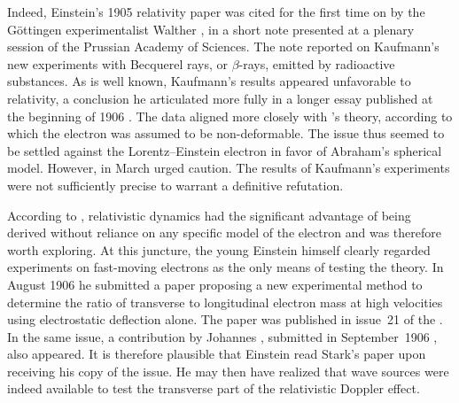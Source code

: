 \documentclass[pdflatex]{sn-jnl} %
\providecommand{\DIFdelbegin}{} %
\providecommand{\DIFdelend}{} %
\begin{document}
Indeed, Einstein’s 1905 relativity paper was cited for the first time on  by the Göttingen experimentalist Walther \citet[954]{Kaufmann1905}, in a short note presented at a plenary session of the Prussian Academy of Sciences. The note reported on Kaufmann’s new experiments with Becquerel rays, or $\beta$-rays, emitted by radioactive substances. As is well known, Kaufmann’s results appeared unfavorable to relativity, a conclusion he articulated more fully in a longer essay published at the beginning of 1906 \citep{Kaufmann1906}. The data aligned more closely with \Abr's theory, according to which the electron was assumed to be non-deformable. The issue thus seemed to be settled against the Lorentz--Einstein electron in favor of Abraham’s spherical model. However, in March \citet{Planck1906a} urged caution. The results of Kaufmann’s experiments were not sufficiently precise to warrant a definitive refutation.

According to \citet{Planck1906}, relativistic dynamics had the significant advantage of being derived without reliance on any specific model of the electron and was therefore worth exploring. At this juncture, the young Einstein himself clearly regarded experiments on fast-moving electrons as the only means of testing the theory. In August 1906 he submitted a paper \citep{Einstein1906c} proposing a new experimental method to determine the ratio of transverse to longitudinal electron mass at high velocities using electrostatic deflection alone. The paper was published in issue~21 of the . In the same issue, a contribution by Johannes \citet{Stark1906}, submitted in September~1906\DIFdelbegin %
\DIFdelend , also appeared. It is therefore plausible that Einstein read Stark’s paper upon receiving his copy of the  issue. He may then have realized that wave sources were indeed available to test the transverse part of the relativistic Doppler effect.


\end{document}
